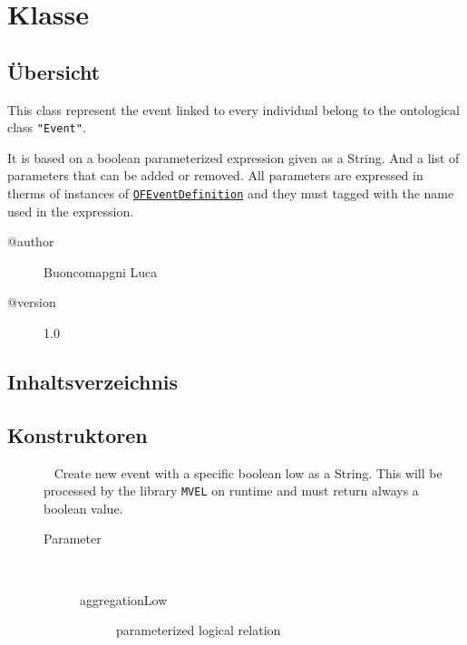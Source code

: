
\section[OFEventAggregation]{Klasse }\label{ontologyFramework.OFEventManagement.OFLogicalEventManagement.OFEventAggregation-class}
\subsection{Übersicht}
This class represent the event linked to every individual belong to the ontological class \verb!"Event"!.
 \par 
 It is based on a boolean parameterized expression given as a String. And a list of parameters that can 
 be added or removed. All parameters are expressed in therms of instances 
 of \texttt{\hyperlink{ontologyFramework.OFEventManagement.OFLogicalEventManagement.OFEventDefinition-class}{OFEventDefinition}} and they must tagged with the name used in the expression.
\begin{description}
\item[@author] 
Buoncomapgni Luca
\item[@version] 
1.0
\end{description}
\subsection{Inhaltsverzeichnis}
\subsection{Konstruktoren}
\begin{description}
\item[{\label{ontologyFramework.OFEventManagement.OFLogicalEventManagement.OFEventAggregation(java.lang.String)}}]
~ Create new event with a specific boolean low as a String. This will be processed by
 the library \texttt{MVEL} on runtime and must return always a boolean value.
\begin{description}
\item[Parameter] ~
\begin{description}
\item[aggregationLow]
parameterized logical relation
\end{description}
\end{description}
\end{description}

